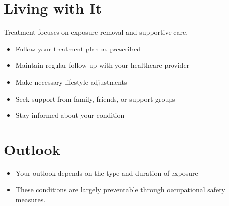 \section{Living with It}
Treatment focuses on exposure removal and supportive care.

\begin{itemize}[noitemsep]
  \item Follow your treatment plan as prescribed
  \item Maintain regular follow-up with your healthcare provider
  \item Make necessary lifestyle adjustments
  \item Seek support from family, friends, or support groups
  \item Stay informed about your condition
\end{itemize}
\section{Outlook}
\begin{itemize}[noitemsep]
  \item Your outlook depends on the type and duration of exposure
  \item These conditions are largely preventable through occupational safety measures.
\end{itemize}
